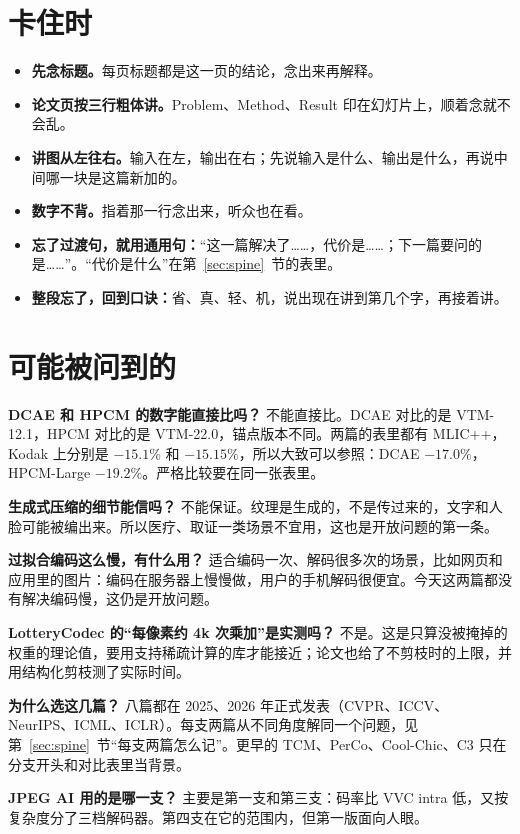 \section{卡住时}

\begin{itemize}
  \item \textbf{先念标题。}每页标题都是这一页的结论，念出来再解释。
  \item \textbf{论文页按三行粗体讲。}Problem、Method、Result 印在幻灯片上，顺着念就不会乱。
  \item \textbf{讲图从左往右。}输入在左，输出在右；先说输入是什么、输出是什么，再说中间哪一块是这篇新加的。
  \item \textbf{数字不背。}指着那一行念出来，听众也在看。
  \item \textbf{忘了过渡句，就用通用句：}“这一篇解决了……，代价是……；下一篇要问的是……”。“代价是什么”在第~\ref{sec:spine}~节的表里。
  \item \textbf{整段忘了，回到口诀：}省、真、轻、机，说出现在讲到第几个字，再接着讲。
\end{itemize}

\section{可能被问到的}

\textbf{DCAE 和 HPCM 的数字能直接比吗？}
不能直接比。DCAE 对比的是 VTM-12.1，HPCM 对比的是 VTM-22.0，锚点版本不同。两篇的表里都有 MLIC++，Kodak 上分别是 $-15.1\%$ 和 $-15.15\%$，所以大致可以参照：DCAE $-17.0\%$，HPCM-Large $-19.2\%$。严格比较要在同一张表里。

\textbf{生成式压缩的细节能信吗？}
不能保证。纹理是生成的，不是传过来的，文字和人脸可能被编出来。所以医疗、取证一类场景不宜用，这也是开放问题的第一条。

\textbf{过拟合编码这么慢，有什么用？}
适合编码一次、解码很多次的场景，比如网页和应用里的图片：编码在服务器上慢慢做，用户的手机解码很便宜。今天这两篇都没有解决编码慢，这仍是开放问题。

\textbf{LotteryCodec 的“每像素约 4k 次乘加”是实测吗？}
不是。这是只算没被掩掉的权重的理论值，要用支持稀疏计算的库才能接近；论文也给了不剪枝时的上限，并用结构化剪枝测了实际时间。

\textbf{为什么选这几篇？}
八篇都在 2025、2026 年正式发表（CVPR、ICCV、NeurIPS、ICML、ICLR）。每支两篇从不同角度解同一个问题，见第~\ref{sec:spine}~节“每支两篇怎么记”。更早的 TCM、PerCo、Cool-Chic、C3 只在分支开头和对比表里当背景。

\textbf{JPEG AI 用的是哪一支？}
主要是第一支和第三支：码率比 VVC intra 低，又按复杂度分了三档解码器。第四支在它的范围内，但第一版面向人眼。
